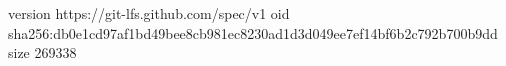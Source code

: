 version https://git-lfs.github.com/spec/v1
oid sha256:db0e1cd97af1bd49bee8cb981ec8230ad1d3d049ee7ef14bf6b2c792b700b9dd
size 269338
